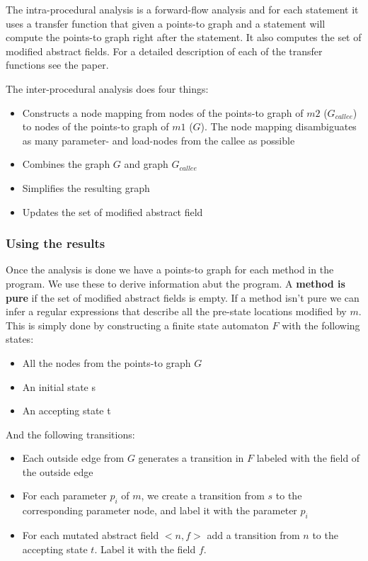 \documentclass[11pt]{exam}
\begin{document}
The intra-procedural analysis is a forward-flow analysis and for each
statement it uses a transfer function that given a points-to graph and
a statement will compute the points-to graph right after the
statement. It also computes the set of modified abstract fields. For a
detailed description of each of the transfer functions see the paper.
\newline

The inter-procedural analysis does four things: 

\begin{itemize}
  \setlength{\itemsep}{1pt}
  \setlength{\parskip}{0pt}
  \item Constructs a node mapping from nodes of the points-to graph of 
        $m2$ ($G_{callee}$) to nodes of the points-to graph of 
        $m1$ ($G$). The node mapping disambiguates as many parameter- 
        and load-nodes from the callee as possible
  \item Combines the graph $G$ and graph $G_{callee}$
  \item Simplifies the resulting graph
  \item Updates the set of modified abstract field
\end{itemize}

\subsubsection*{Using the results}

Once the analysis is done we have a points-to graph for each method in
the program. We use these to derive information abut the
program. A \textbf{method is pure} if the set of modified abstract
fields is empty. If a method isn't pure we can infer a regular
expressions that describe all the pre-state locations modified by $m$.
This  is simply done by constructing a finite state automaton $F$ with
the following states:

\begin{itemize}
  \setlength{\itemsep}{1pt}
  \setlength{\parskip}{0pt}
  \item All the nodes from the points-to graph $G$
  \item An initial state s
  \item An accepting state t
\end{itemize}

And the following transitions: 

\begin{itemize}
  \setlength{\itemsep}{1pt}
  \setlength{\parskip}{0pt}
  \item Each outside edge from $G$ generates a transition in $F$ labeled with 
        the field of the outside edge
  \item For each parameter $p_i$ of $m$, we create a transition from $s$ to 
        the corresponding parameter node, and label it with the parameter $p_i$
  \item For each mutated abstract field $<n,f>$ add a transition from $n$ to the 
        accepting state $t$. Label it with the field $f$.
\end{itemize}
\end{document}
